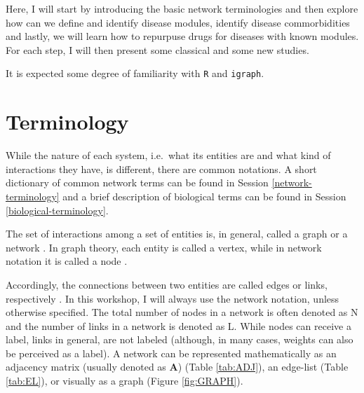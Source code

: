 \documentclass[
]{book}
\begin{document}
Here, I will start by introducing the basic network terminologies and then explore how can we define and identify disease modules, identify disease commorbidities and lastly, we will learn how to repurpuse drugs for diseases with known modules. For each step, I will then present some classical and some new studies.

It is expected some degree of familiarity with \texttt{R} and \texttt{igraph}.

\hypertarget{terminology}{%
\section{Terminology}\label{terminology}}

While the nature of each system, i.e.~what its entities are and what kind of interactions they have, is different, there are common notations. A short dictionary of common network terms can be found in Session \ref{network-terminology} and a brief description of biological terms can be found in Session \ref{biological-terminology}.

The set of interactions among a set of entities is, in general, called a graph or a network \citep{Newman2018, Barabasi2016}. In graph theory, each entity is called a vertex, while in network notation it is called a node \citep{Barabasi2016}.

Accordingly, the connections between two entities are called edges or links, respectively \citep{Barabasi2016}. In this workshop, I will always use the network notation, unless otherwise specified. The total number of nodes in a network is often denoted as N and the number of links in a network is denoted as L. While nodes can receive a label, links in general, are not labeled \citep{Barabasi2016} (although, in many cases, weights can also be perceived as a label). A network can be represented mathematically as an adjacency matrix (usually denoted as \textbf{A}) (Table \ref{tab:ADJ}), an edge-list (Table \ref{tab:EL}), or visually as a graph (Figure \ref{fig:GRAPH}).
\end{document}
